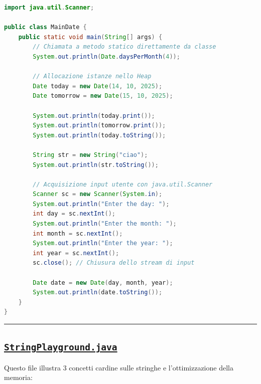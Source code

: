 \documentclass[11pt,a4paper,oneside]{report}
\begin{document}
\begin{lstlisting}[language=Java]
import java.util.Scanner;

public class MainDate {
    public static void main(String[] args) {
        // Chiamata a metodo statico direttamente da classe
        System.out.println(Date.daysPerMonth(4));

        // Allocazione istanze nello Heap
        Date today = new Date(14, 10, 2025);
        Date tomorrow = new Date(15, 10, 2025);

        System.out.println(today.print());
        System.out.println(tomorrow.print());
        System.out.println(today.toString());

        String str = new String("ciao");
        System.out.println(str.toString());

        // Acquisizione input utente con java.util.Scanner
        Scanner sc = new Scanner(System.in);
        System.out.println("Enter the day: ");
        int day = sc.nextInt();
        System.out.println("Enter the month: ");
        int month = sc.nextInt();
        System.out.println("Enter the year: ");
        int year = sc.nextInt();
        sc.close(); // Chiusura dello stream di input

        Date date = new Date(day, month, year);
        System.out.println(date.toString());
    }
}
\end{lstlisting}

\begin{center}\rule{0.5\linewidth}{0.5pt}\end{center}

\subsection{\texorpdfstring{\href{file:///home/wally/Documenti/GitHub/Programmazione-II/25-26/Teoria-e-Esercitazioni/Codice-20260902/Lezioni05-06/StringPlayground.java}{\texttt{StringPlayground.java}}}{StringPlayground.java}}\label{chap05_stringplayground.java}

Questo file illustra 3 concetti cardine sulle stringhe e
l'ottimizzazione della memoria:
\end{document}
